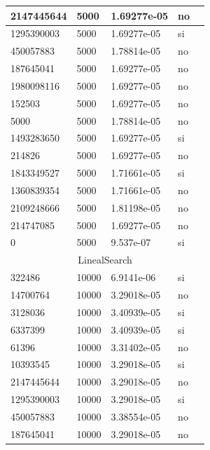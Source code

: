 \documentclass[12pt, fleqn]{article}                             %
\theoremstyle{break}                                            %
\begin{document}
\begin{longtable}{|m{5em}|m{5em}|m{10em}|m{5em}|@{}m{0pt}@{}}
            2147445644& 5000  & 1.69277e-05 & no &\\[1em]    \hline
            1295390003& 5000  & 1.69277e-05 & si &\\[1em]    \hline
            450057883& 5000  & 1.78814e-05 & no &\\[1em]    \hline
            187645041& 5000  & 1.69277e-05 & no &\\[1em]    \hline
            1980098116& 5000  & 1.69277e-05 & no &\\[1em]    \hline
            152503& 5000  & 1.69277e-05 & no &\\[1em]    \hline
            5000& 5000  & 1.78814e-05 & no &\\[1em]    \hline
            1493283650& 5000  & 1.69277e-05 & si &\\[1em]    \hline
            214826& 5000  & 1.69277e-05 & no &\\[1em]    \hline
            1843349527& 5000  & 1.71661e-05 & si &\\[1em]    \hline
            1360839354& 5000  & 1.71661e-05 & no &\\[1em]    \hline
            2109248666& 5000  & 1.81198e-05 & no &\\[1em]    \hline
            214747085& 5000  & 1.69277e-05 & no &\\[1em]    \hline
            0& 5000  & 9.537e-07 & si &\\[1em]    \hline
            \multicolumn{5}{|c|}{LinealSearch}   \\          \hline
            322486& 10000  & 6.9141e-06 & si &\\[1em]    \hline
            14700764& 10000  & 3.29018e-05 & no &\\[1em]    \hline
            3128036& 10000  & 3.40939e-05 & si &\\[1em]    \hline
            6337399& 10000  & 3.40939e-05 & si &\\[1em]    \hline
            61396& 10000  & 3.31402e-05 & no &\\[1em]    \hline
            10393545& 10000  & 3.29018e-05 & si &\\[1em]    \hline
            2147445644& 10000  & 3.29018e-05 & no &\\[1em]    \hline
            1295390003& 10000  & 3.29018e-05 & si &\\[1em]    \hline
            450057883& 10000  & 3.38554e-05 & no &\\[1em]    \hline
            187645041& 10000  & 3.29018e-05 & no &\\[1em]    \hline

\end{longtable}
\end{document}

